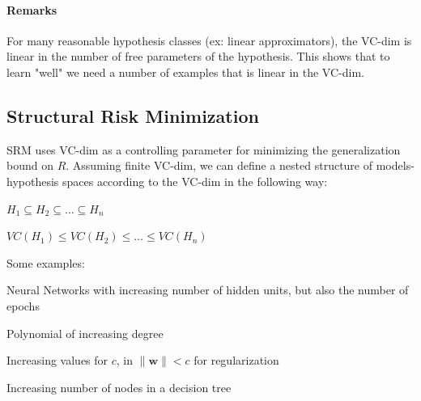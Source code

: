 \documentclass[10pt]{report}
\begin{document}
\paragraph{Remarks} For many reasonable hypothesis classes (ex: linear approximators), the VC-dim is linear in the number of free parameters of the hypothesis. This shows that to learn "well" we need a number of examples that is linear in the VC-dim.
\subsection{Structural Risk Minimization} SRM uses VC-dim as a controlling parameter for minimizing the generalization bound on $R$. Assuming finite VC-dim, we can define a nested structure of models-hypothesis spaces according to the VC-dim in the following way:
\begin{list}{}{}
	\item $H_1\subseteq H_2\subseteq \ldots\subseteq H_n$
	\item $VC(H_1)\leq VC(H_2)\leq \ldots\leq VC(H_n)$
\end{list}
Some examples:
\begin{list}{}{}
	\item Neural Networks with increasing number of hidden units, but also the number of epochs
	\item Polynomial of increasing degree
	\item Increasing values for $c$, in $\|\mathbf{w}\|<c$ for regularization
	\item Increasing number of nodes in a decision tree
\end{list}
\end{document}
